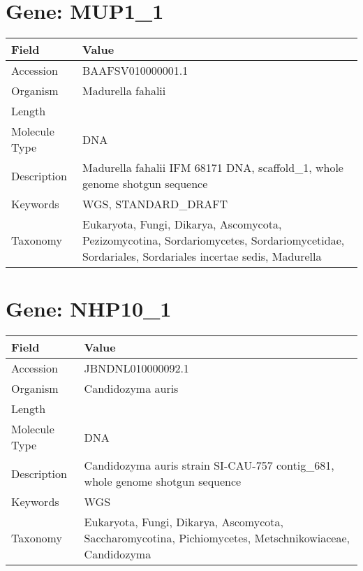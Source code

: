 \documentclass[10pt]{article}
\begin{document}
\section*{Gene: MUP1\_1}
{\footnotesize
\begin{longtable}{>{\raggedright\arraybackslash}p{4.5cm} >{\raggedright\arraybackslash}p{11.5cm}}
\textbf{Field} & \textbf{Value} \\
\hline
Accession & BAAFSV010000001.1 \\
Organism & Madurella fahalii \\
Length & 10295420 \\
Molecule Type & DNA \\
Description & Madurella fahalii IFM 68171 DNA, scaffold\_1, whole genome shotgun sequence \\
Keywords & WGS, STANDARD\_DRAFT \\
Taxonomy & Eukaryota, Fungi, Dikarya, Ascomycota, Pezizomycotina, Sordariomycetes, Sordariomycetidae, Sordariales, Sordariales incertae sedis, Madurella \\
\end{longtable}
}


\section*{Gene: NHP10\_1}
{\footnotesize
\begin{longtable}{>{\raggedright\arraybackslash}p{4.5cm} >{\raggedright\arraybackslash}p{11.5cm}}
\textbf{Field} & \textbf{Value} \\
\hline
Accession & JBNDNL010000092.1 \\
Organism & Candidozyma auris \\
Length & 503786 \\
Molecule Type & DNA \\
Description & Candidozyma auris strain SI-CAU-757 contig\_681, whole genome shotgun sequence \\
Keywords & WGS \\
Taxonomy & Eukaryota, Fungi, Dikarya, Ascomycota, Saccharomycotina, Pichiomycetes, Metschnikowiaceae, Candidozyma \\
\end{longtable}
}
\end{document}
